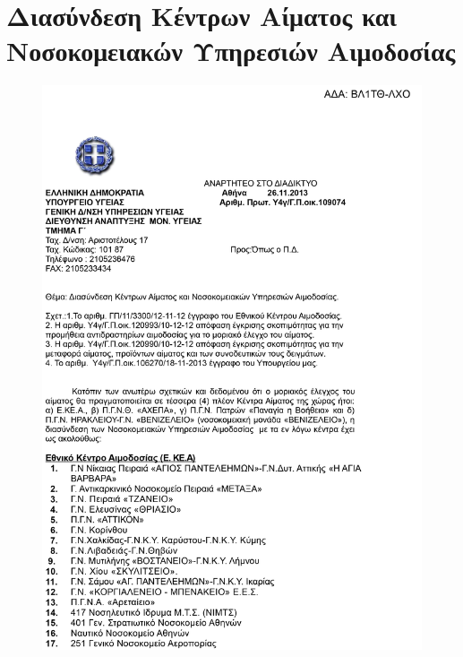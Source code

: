 \graphicspath{ {Figures/appendix/} }
\chapter{Διασύνδεση Κέντρων Αίματος και Νοσοκομειακών Υπηρεσιών Αιμοδοσίας}\label{ch:blood_centers}
\newpage
	\begin{figure}[H]
	    \centering
	    \includegraphics[width=1\textwidth]{blood_centers_1.png}
	\end{figure}

